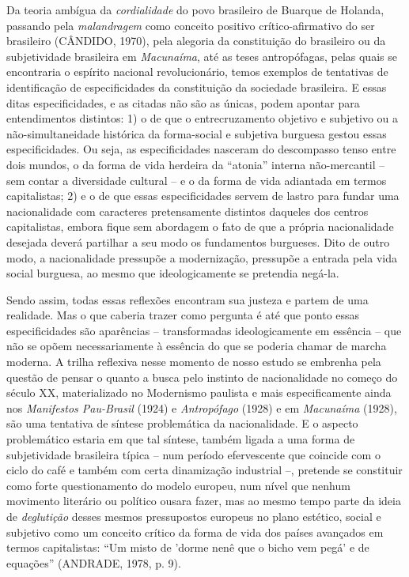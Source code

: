 Da teoria ambígua da \emph{cordialidade} do povo brasileiro de Buarque
de Holanda, passando pela \emph{malandragem} como conceito positivo
crítico-afirmativo do ser brasileiro (CÂNDIDO, 1970), pela alegoria da
constituição do brasileiro ou da subjetividade brasileira em
\emph{Macunaíma}, até as teses antropófagas, pelas quais se encontraria
o espírito nacional revolucionário, temos exemplos de tentativas de
identificação de especificidades da constituição da sociedade
brasileira. E essas ditas especificidades, e as citadas não são as
únicas, podem apontar para entendimentos distintos: 1) o de que o
entrecruzamento objetivo e subjetivo ou a não-simultaneidade histórica
da forma-social e subjetiva burguesa gestou essas especificidades. Ou
seja, as especificidades nasceram do descompasso tenso entre dois
mundos, o da forma de vida herdeira da ``atonia'' interna não-mercantil
-- sem contar a diversidade cultural -- e o da forma de vida adiantada
em termos capitalistas; 2) e o de que essas especificidades servem de
lastro para fundar uma nacionalidade com caracteres pretensamente
distintos daqueles dos centros capitalistas, embora fique sem abordagem
o fato de que a própria nacionalidade desejada deverá partilhar a seu
modo os fundamentos burgueses. Dito de outro modo, a nacionalidade
pressupõe a modernização, pressupõe a entrada pela vida social burguesa,
ao mesmo que ideologicamente se pretendia negá-la.

Sendo assim, todas essas reflexões encontram sua justeza e partem de uma
realidade. Mas o que caberia trazer como pergunta é até que ponto essas
especificidades são aparências -- transformadas ideologicamente em
essência -- que não se opõem necessariamente à essência do que se
poderia chamar de marcha moderna. A trilha reflexiva nesse momento de
nosso estudo se embrenha pela questão de pensar o quanto a busca pelo
instinto de nacionalidade no começo do século XX, materializado no
Modernismo paulista e mais especificamente ainda nos \emph{Manifestos
Pau-Brasil} (1924) e \emph{Antropófago} (1928) e em \emph{Macunaíma}
(1928), são uma tentativa de síntese problemática da nacionalidade. E o
aspecto problemático estaria em que tal síntese, também ligada a uma
forma de subjetividade brasileira típica -- num período efervescente que
coincide com o ciclo do café e também com certa dinamização industrial
--, pretende se constituir como forte questionamento do modelo europeu,
num nível que nenhum movimento literário ou político ousara fazer, mas
ao mesmo tempo parte da ideia de \emph{deglutição} desses mesmos
pressupostos europeus no plano estético, social e subjetivo como um
conceito crítico da forma de vida dos países avançados em termos
capitalistas: ``Um misto de 'dorme nenê que o bicho vem pegá' e de
equações'' (ANDRADE, 1978, p. 9).

